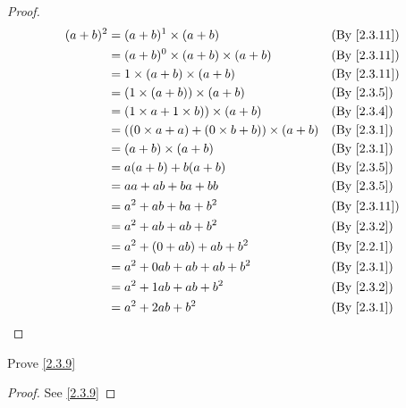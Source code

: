 \begin{proof}
  \begin{align*}
    (a + b)^2 & = (a + b)^1 \times (a + b)                             &  & \text{(By \cref{2.3.11})} \\
              & = (a + b)^0 \times (a + b) \times (a + b)              &  & \text{(By \cref{2.3.11})} \\
              & = 1 \times (a + b) \times (a + b)                      &  & \text{(By \cref{2.3.11})} \\
              & = (1 \times (a + b)) \times (a + b)                    &  & \text{(By \cref{2.3.5})}  \\
              & = (1 \times a + 1 \times b)) \times (a + b)            &  & \text{(By \cref{2.3.4})}  \\
              & = ((0 \times a + a) + (0 \times b + b)) \times (a + b) &  & \text{(By \cref{2.3.1})}  \\
              & = (a + b) \times (a + b)                               &  & \text{(By \cref{2.3.1})}  \\
              & = a(a + b) + b(a + b)                                  &  & \text{(By \cref{2.3.5})}  \\
              & = aa + ab + ba + bb                                    &  & \text{(By \cref{2.3.5})}  \\
              & = a^2 + ab + ba + b^2                                  &  & \text{(By \cref{2.3.11})} \\
              & = a^2 + ab + ab + b^2                                  &  & \text{(By \cref{2.3.2})}  \\
              & = a^2 + (0 + ab) + ab + b^2                            &  & \text{(By \cref{2.2.1})}  \\
              & = a^2 + 0ab + ab + ab + b^2                            &  & \text{(By \cref{2.3.1})}  \\
              & = a^2 + 1ab + ab + b^2                                 &  & \text{(By \cref{2.3.2})}  \\
              & = a^2 + 2ab + b^2                                      &  & \text{(By \cref{2.3.1})}  \\
  \end{align*}
\end{proof}

\begin{ex}\label{ex:2.3.5}
  Prove \cref{2.3.9}
\end{ex}

\begin{proof}
  See \cref{2.3.9}
\end{proof}